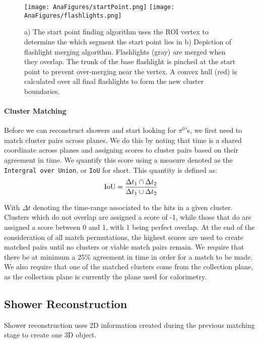 \documentclass[12pt]{article}
\begin{document}
\begin{figure}[h!]
\centering
\texttt{[image: AnaFigures/startPoint.png]}
\hspace{3 mm}
\texttt{[image: AnaFigures/flashlights.png]}
\caption{a) The start point finding algorithm uses the ROI vertex to determine the which segment the start point lies in   b) Depiction of flashlight merging algorithm. Flashlights (gray) are merged when they overlap. The trunk of the base flashlight is pinched at the start point to prevent over-merging near the vertex. A convex hull (red) is calculated over all final flashlights to form the new cluster boundaries. }
\label{fig:flashlights}
\end{figure}

\paragraph{Cluster Matching}
Before we can reconstruct showers and start looking for $\pi^0$'s, we first need to match cluster pairs across planes. We do this by noting that time is a shared coordinate across planes and assigning scores to cluster pairs based on their agreement in time. We quantify this score using a measure denoted as the \texttt{Intergral over Union}, or \texttt{IoU} for short. This quantity is defined as:
\begin{equation}
  {\rm IoU} = \frac{ \Delta t_1 \cap \Delta t_2  }{ \Delta t_1 \cup \Delta t_2 }
\end{equation}

With $\Delta t$ denoting the time-range associated to the hits in a given cluster.  Clusters which do not overlap are assigned a score of -1, while those that do are assigned a score between 0 and 1, with 1 being perfect overlap. At the end of the consideration of all match permutations, the highest scores are used to create matched pairs until no clusters or viable match pairs remain. We require that there be at minimum a 25\% agreement in time in order for a match to be made. We also require that one of the matched clusters come from the collection plane, as the collection plane is currently the plane used for calorimetry. 

\subsection{Shower Reconstruction}
Shower reconstruction uses 2D information created during the previous matching stage to create one 3D object. 
\end{document}
